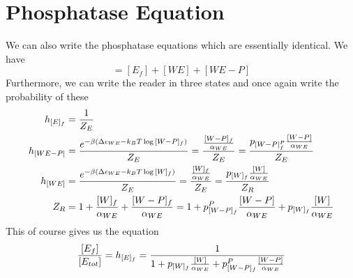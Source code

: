 \documentclass[preprint,onecolumn,amsmath]{revtex4-1}
\def\be{\begin{equation}}
\def\ee{\end{equation}}
\begin{document}
\section{Phosphatase Equation}

We can also write the phosphatase equations which are essentially identical. We have 
\be
[E_{tot}]= [E_f]+[WE]+[WE-P]
\ee
Furthermore, we can write the reader in three states and once again write the probability of these
\begin{align}
h_{[E]_f} &= {1 \over Z_{E}} \\
h_{[WE-P]} &= {e^{-\beta (\Delta \epsilon_{WE} -k_B T \log{[W-P]_f})}  \over Z_{E}} ={ {[W-P]_f \over \alpha_{WE}} \over Z_E}=
{ p_{[W-P]_f^P} {[W-P] \over \alpha_{WE}} \over Z_E} \\
h_{[WE]} &= {e^{-\beta (\Delta \epsilon_{WE} -k_B T \log{[W]_f})}  \over Z_{E}} ={ {[W]_f \over \alpha_{WE}} \over Z_E}=
{ p_{[W]_f} {[W] \over \alpha_{WE}} \over Z_R}\\
Z_R  &= 1+  {[W]_f \over \alpha_{WE}}+ {[W-P]_f \over \alpha_{WE}}=1+   p_{[W-P]_f}^P {[W-P] \over \alpha_{WE}}+ p_{[W]_f} {[W] \over
 \alpha_{WE}} 
\end{align} 
This of course gives us the equation
\be
{ [E_f] \over [E_{tot}]} = h_{[E]_f}={1 \over 1+   p_{[W]_f} {[W] \over \alpha_{WE}}+ p_{[W-P]_f}^P {[W-P] \over \alpha_{WE}}}
\ee
\end{document}
